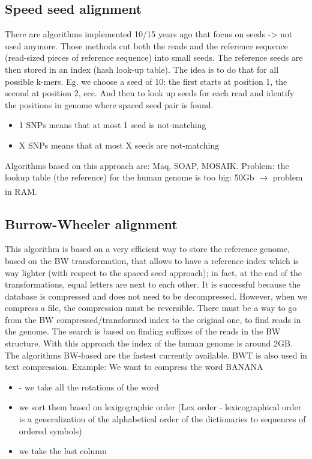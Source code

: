 
\subsection{Speed seed alignment}

There are algorithms implemented 10/15 years ago that focus on seeds -> not used anymore. 
Those methods cut both the reads and the reference sequence (read-sized pieces of reference sequence) into small seeds. The reference seeds are then stored in an index (hash look-up table).
The idea is to do that for all possible k-mers. Eg. we choose a seed of 10: the first starts at position 1, the second at position 2, ecc. And then to look up seeds for each read and identify the positions in genome where spaced seed pair is found. 

\begin{itemize}
    \item 1 SNPs means that at most 1 seed is not-matching
    \item X SNPs means that at most X seeds are not-matching
\end{itemize}

Algorithms based on this approach are: Maq, SOAP, MOSAIK. 
Problem: the lookup table (the reference) for the human genome is too big: 50Gb $\xrightarrow[]{}$ problem in RAM.

\subsection{Burrow-Wheeler alignment}
This algorithm is based on a very efficient way to store the reference genome, based on the BW transformation, that allows to have a reference index which is way lighter (with respect to the spaced seed approach); in fact, at the end of the transformations, equal letters are next to each other. It is successful because the database is compressed and does not need to be decompressed. However, when we compress a file, the compression must be reversible. There must be a way to go from the BW compressed/transformed index to the original one, to find reads in the genome. 
The search is based on finding suffixes of the reads in the BW structure. With this approach the index of the human genome is around 2GB. The algorithms BW-based are the fastest currently available. 
BWT is also used in text compression.
Example:
We want to compress the word BANANA
\begin{itemize}
    \item - we take all the rotations of the word
    \item we sort them based on lexigographic order (Lex order - lexicographical order is a generalization of the alphabetical order of the dictionaries to sequences of ordered symbols) 
    \item we take the last column
\end{itemize}

